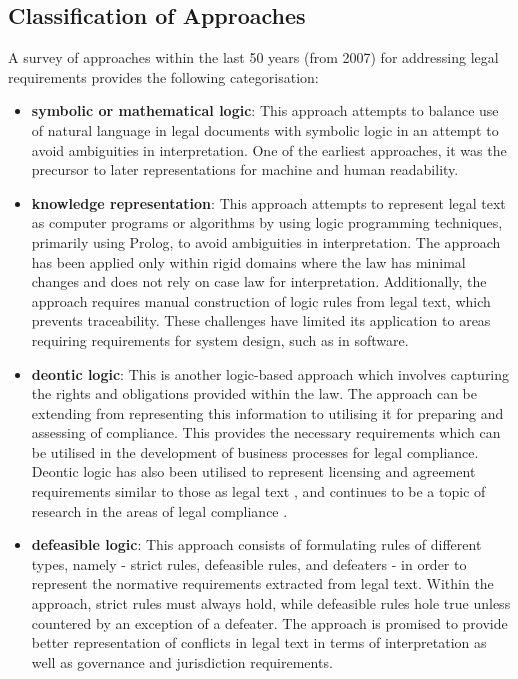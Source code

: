 \subsection{Classification of Approaches}
A survey of approaches within the last 50 years (from 2007) for addressing legal requirements \cite{otto_addressing_2007} provides the following categorisation:
\begin{itemize}
    \item \textbf{symbolic or mathematical logic}:  This approach attempts to balance use of natural language in legal documents with symbolic logic in an attempt to avoid ambiguities in interpretation. One of the earliest approaches, it was the precursor to later representations for machine and human readability.
    \item \textbf{knowledge representation}: This approach attempts to represent legal text as computer programs or algorithms by using logic programming techniques, primarily using Prolog, to avoid ambiguities in interpretation. The approach has been applied only within rigid domains where the law has minimal changes and does not rely on case law for interpretation. Additionally, the approach requires manual construction of logic rules from legal text, which prevents traceability. These challenges have limited its application to areas requiring requirements for system design, such as in software.
	\item \textbf{deontic logic}: This is another logic-based approach which involves capturing the rights and obligations provided within the law. The approach can be extending from representing this information to utilising it for preparing and assessing of compliance. This provides the necessary requirements which can be utilised in the development of business processes for legal compliance. Deontic logic has also been utilised to represent licensing and agreement requirements similar to those as legal text \cite{pellegrini_genealogy_2018}, and continues to be a topic of research in the areas of legal compliance \cite{palmirani_pronto:_2018,agarwal_legislative_2018,vos_odrl_2019}.
	\item \textbf{defeasible logic}: This approach consists of formulating rules of different types, namely - strict rules, defeasible rules, and defeaters - in order to represent the normative requirements extracted from legal text. Within the approach, strict rules must always hold, while defeasible rules hole true unless countered by an exception of a defeater. The approach is promised to provide better representation of conflicts in legal text in terms of interpretation as well as governance and jurisdiction requirements.

\end{itemize}
